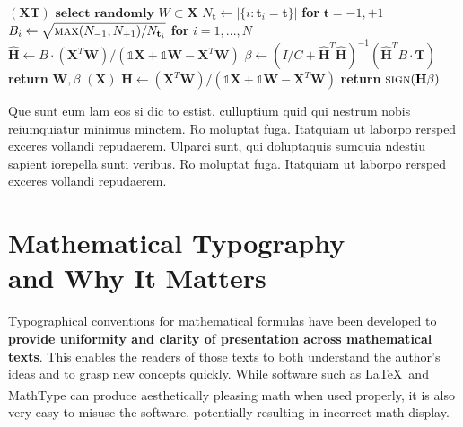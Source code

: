 \begin{algorithm}[H]
\caption{Weighted Tanimoto ELM.}\label{alg:alg1}
\begin{algorithmic}
\STATE 
{}$(\mathbf{X} \mathbf{T})$
\STATE \hspace{0.5cm}$ \textbf{select randomly } W \subset \mathbf{X}  $
\STATE \hspace{0.5cm}$ N_\mathbf{t} \gets | \{ i : \mathbf{t}_i = \mathbf{t} \} | $ \textbf{ for } $ \mathbf{t}= -1,+1 $
\STATE \hspace{0.5cm}$ B_i \gets \sqrt{ \textsc{max}(N_{-1},N_{+1}) / N_{\mathbf{t}_i} } $ \textbf{ for } $ i = 1,...,N $
\STATE \hspace{0.5cm}$ \hat{\mathbf{H}} \gets  B \cdot (\mathbf{X}^T\textbf{W})/( \mathbb{1}\mathbf{X} + \mathbb{1}\textbf{W} - \mathbf{X}^T\textbf{W} ) $
\STATE \hspace{0.5cm}$ \beta \gets \left ( I/C + \hat{\mathbf{H}}^T\hat{\mathbf{H}} \right )^{-1}(\hat{\mathbf{H}}^T B\cdot \mathbf{T})  $
\STATE \hspace{0.5cm}\textbf{return}  $\textbf{W},  \beta $
\STATE 
{}$(\mathbf{X} )$
\STATE \hspace{0.5cm}$ \mathbf{H} \gets  (\mathbf{X}^T\textbf{W} )/( \mathbb{1}\mathbf{X}  + \mathbb{1}\textbf{W}- \mathbf{X}^T\textbf{W}  ) $
\STATE \hspace{0.5cm}\textbf{return}  $\textsc{sign}( \mathbf{H} \beta )$
\end{algorithmic}
\label{alg1}
\end{algorithm}

Que sunt eum lam eos si dic to estist, culluptium quid qui nestrum nobis reiumquiatur minimus minctem. Ro moluptat fuga. Itatquiam ut laborpo rersped exceres vollandi repudaerem. Ulparci sunt, qui doluptaquis sumquia ndestiu sapient iorepella sunti veribus. Ro moluptat fuga. Itatquiam ut laborpo rersped exceres vollandi repudaerem. 
\section{Mathematical Typography \\ and Why It Matters}

Typographical conventions for mathematical formulas have been developed to {\bf provide uniformity and clarity of presentation across mathematical texts}. This enables the readers of those texts to both understand the author's ideas and to grasp new concepts quickly. While software such as \LaTeX \ and MathType\textsuperscript{\textregistered} can produce aesthetically pleasing math when used properly, it is also very easy to misuse the software, potentially resulting in incorrect math display.

